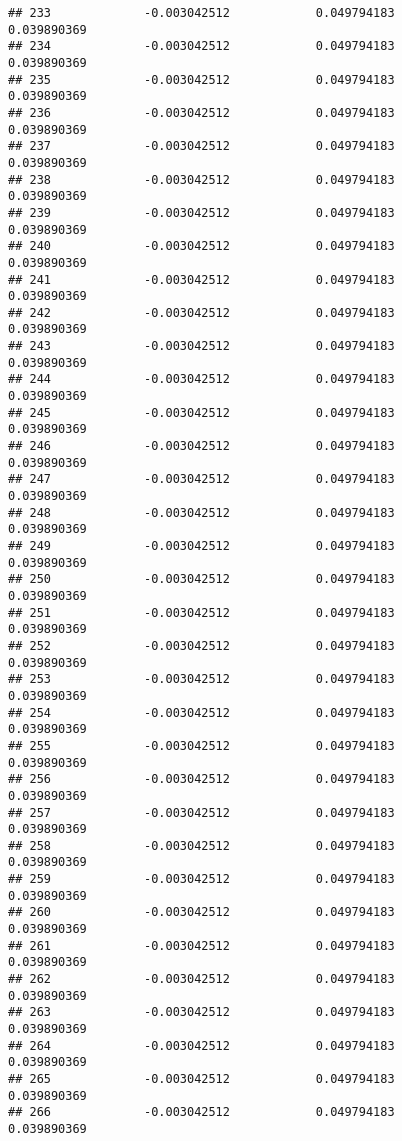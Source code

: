 \documentclass[]{article}
\begin{document}
\begin{verbatim}
## 233             -0.003042512            0.049794183            0.039890369
## 234             -0.003042512            0.049794183            0.039890369
## 235             -0.003042512            0.049794183            0.039890369
## 236             -0.003042512            0.049794183            0.039890369
## 237             -0.003042512            0.049794183            0.039890369
## 238             -0.003042512            0.049794183            0.039890369
## 239             -0.003042512            0.049794183            0.039890369
## 240             -0.003042512            0.049794183            0.039890369
## 241             -0.003042512            0.049794183            0.039890369
## 242             -0.003042512            0.049794183            0.039890369
## 243             -0.003042512            0.049794183            0.039890369
## 244             -0.003042512            0.049794183            0.039890369
## 245             -0.003042512            0.049794183            0.039890369
## 246             -0.003042512            0.049794183            0.039890369
## 247             -0.003042512            0.049794183            0.039890369
## 248             -0.003042512            0.049794183            0.039890369
## 249             -0.003042512            0.049794183            0.039890369
## 250             -0.003042512            0.049794183            0.039890369
## 251             -0.003042512            0.049794183            0.039890369
## 252             -0.003042512            0.049794183            0.039890369
## 253             -0.003042512            0.049794183            0.039890369
## 254             -0.003042512            0.049794183            0.039890369
## 255             -0.003042512            0.049794183            0.039890369
## 256             -0.003042512            0.049794183            0.039890369
## 257             -0.003042512            0.049794183            0.039890369
## 258             -0.003042512            0.049794183            0.039890369
## 259             -0.003042512            0.049794183            0.039890369
## 260             -0.003042512            0.049794183            0.039890369
## 261             -0.003042512            0.049794183            0.039890369
## 262             -0.003042512            0.049794183            0.039890369
## 263             -0.003042512            0.049794183            0.039890369
## 264             -0.003042512            0.049794183            0.039890369
## 265             -0.003042512            0.049794183            0.039890369
## 266             -0.003042512            0.049794183            0.039890369

\end{verbatim}
\end{document}
